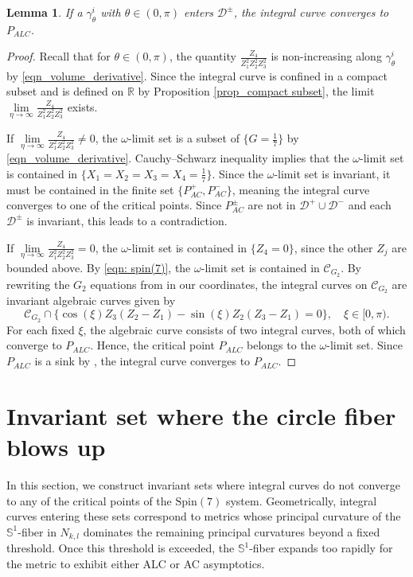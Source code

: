 \documentclass[11pt,letterpaper]{amsart}
\newtheorem{lemma}[theorem]{Lemma}
\theoremstyle{definition}
\numberwithin{equation}{section}
\newcommand{\spin}{\mathrm{Spin}}
\begin{document}
\begin{lemma}
\label{lem_ALC asymp}
If a $\gamma_\theta^i$ with $\theta\in (0,\pi)$ enters $\mathcal{D}^\pm$, the integral curve converges to $P_{ALC}$.
\end{lemma}
\begin{proof}
Recall that for $\theta\in (0,\pi)$, the quantity $\frac{Z_4}{Z_1^2Z_2^2Z_3^2}$ is non-increasing along $\gamma_\theta^i$ by \eqref{eqn_volume_derivative}. Since the integral curve is confined in a compact subset and is defined on $\mathbb{R}$ by Proposition \ref{prop_compact subset}, the limit $\lim\limits_{\eta\to\infty}\frac{Z_4}{Z_1^2Z_2^2Z_3^2}$ exists.

If $\lim\limits_{\eta\to\infty}\frac{Z_4}{Z_1^2Z_2^2Z_3^2}\neq 0$, the $\omega$-limit set is a subset of $\{G=\frac{1}{7}\}$ by \eqref{eqn_volume_derivative}. Cauchy--Schwarz inequality implies that the $\omega$-limit set is contained in $\{X_1=X_2=X_3=X_4=\frac{1}{7}\}$. Since the $\omega$-limit set is invariant, it must be contained in the finite set $\{P_{AC}^+,P_{AC}^-\}$, meaning the integral curve converges to one of the critical points. Since $P_{AC}^\pm$ are not in $\mathcal{D}^+\cup\mathcal{D}^-$ and each $\mathcal{D}^\pm$ is invariant, this leads to a contradiction.

If $\lim\limits_{\eta\to\infty}\frac{Z_4}{Z_1^2Z_2^2Z_3^2}=0$, the $\omega$-limit set is contained in $\{Z_4=0\}$, since the other $Z_j$ are bounded above. By \eqref{eqn: spin(7)}, the $\omega$-limit set is contained in $\mathcal{C}_{G_2}$. By rewriting the $G_2$ equations from \cite{cleyton_cohomogeneity-one_2002} in our coordinates, the integral curves on $\mathcal{C}_{G_2}$ are invariant algebraic curves given by
$$
\mathcal{C}_{G_2}\cap \{\cos(\xi)Z_3(Z_2 - Z_1) - \sin(\xi) Z_2(Z_3 -Z_1) =0\},\quad \xi \in [0,\pi).
$$
For each fixed $\xi$, the algebraic curve consists of two integral curves, both of which converge to $P_{ALC}$. Hence, the critical point $P_{ALC}$ belongs to the $\omega$-limit set. Since $P_{ALC}$ is a sink by \cite[(3.5)]{chi2022spin}, the integral curve converges to $P_{ALC}$. 
\end{proof}

\section{Invariant set where the circle fiber blows up}
\label{sec: invariant set 2}
In this section, we construct invariant sets where integral curves do not converge to any of the critical points of the $\spin(7)$ system. Geometrically, integral curves entering these sets correspond to metrics whose principal curvature of the $\mathbb{S}^1$-fiber in $N_{k,l}$ dominates the remaining principal curvatures beyond a fixed threshold. Once this threshold is exceeded, the $\mathbb{S}^1$-fiber expands too rapidly for the metric to exhibit either ALC or AC asymptotics. 
\end{document}
